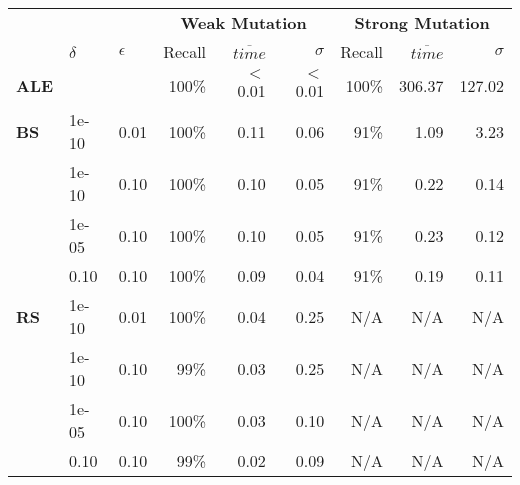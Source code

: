 \begin{small} 
\begin{tabular}{lll|r|r|r|r|r|r} 
 & & & \multicolumn{3}{c|}{\textbf{Weak Mutation}} & \multicolumn{3}{c}{\textbf{Strong Mutation}}\\ 
 & $\delta$ & $\epsilon$ & Recall & $\overline{time}$ & $\sigma$ & Recall & $\overline{time}$ & $\sigma$ \\  
\hline 
\textbf{ALE} & & & 100\% & $<$0.01  & $<$0.01  & 100\% & 306.37  & 127.02  \\ 
\textbf{BS}  & 1e-10  & 0.01  & 100\% & 0.11  & 0.06  & 91\% & 1.09  & 3.23\\
 & 1e-10  & 0.10  & 100\% & 0.10  & 0.05  & 91\% & 0.22  & 0.14\\
 & 1e-05  & 0.10  & 100\% & 0.10  & 0.05  & 91\% & 0.23  & 0.12\\
 & 0.10  & 0.10  & 100\% & 0.09  & 0.04  & 91\% & 0.19  & 0.11\\
\textbf{RS}  & 1e-10  & 0.01  & 100\% & 0.04  & 0.25 & N/A & N/A & N/A \\
 & 1e-10  & 0.10  & 99\% & 0.03  & 0.25 & N/A & N/A & N/A \\
 & 1e-05  & 0.10  & 100\% & 0.03  & 0.10 & N/A & N/A & N/A \\
 & 0.10  & 0.10  & 99\% & 0.02  & 0.09 & N/A & N/A & N/A \\
\end{tabular} 
\end{small}


